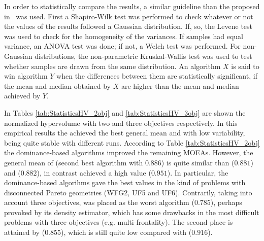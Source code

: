 %
In order to statistically compare the \HV{} results, a similar guideline than the proposed in~\cite{Joel:StatisticalTest} was used. 
%
First a Shapiro-Wilk test was performed to check whatever or not the values of the results followed a Gaussian distribution. 
%
If, so, the Levene test was used to check for the homogeneity of the variances. 
%
If samples had equal variance, an ANOVA test was done; if not, a Welch test was performed. 
%
For non-Gaussian distributions, the non-parametric Kruskal-Wallis test was used to test whether samples are drawn from the same distribution. 
%
An algorithm $X$ is said to win algorithm $Y$ when the differences between them are statistically significant, if the mean and median obtained by $X$ are higher than the mean and median achieved by $Y$.
%

In Tables \ref{tab:StatisticsHV_2obj} and \ref{tab:StatisticsHV_3obj} are shown the normalized hypervolume with two and three objectives respectively.
%
In this empirical results the \VSDMOEA{} achieved the best general mean and with low variability, being quite stable with different runs.
%
According to Table \ref{tab:StatisticsHV_2obj} the dominance-based algorithms improved the remaining MOEAs.
%
However, the general mean of \NSGAII{} (second best algorithm with $0.886$) is quite similar than \MOEAD{} ($0.881$) and \RMOEA{} ($0.882$), in contrast \VSDMOEA{} achieved a high \HV{} value ($0.951$).
%
In particular, the dominance-based algorihms gave the best values in the kind of problems with disconnected Pareto geometries (WFG2, UF5 and UF6).
%
Contrarily, taking into account three objectives, \NSGAII{} was placed as the worst algorithm ($0.785$), perhaps provoked by its density estimator, which has some drawbacks in the most difficult problems with three objectives (e.g. multi-frontality).
%
The second place is attained by \RMOEA{} ($0.855$), which is still quite low compared with \VSDMOEA{} ($0.916$).
%


